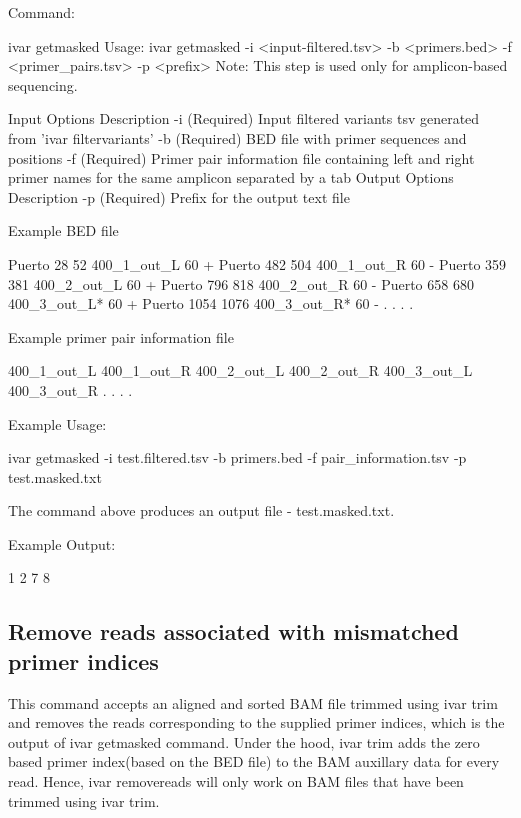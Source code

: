 Command\+:


\begin{DoxyCode}
ivar getmasked
Usage: ivar getmasked -i <input-filtered.tsv> -b <primers.bed> -f <primer\_pairs.tsv> -p <prefix>
Note: This step is used only for amplicon-based sequencing.

Input Options    Description
           -i    (Required) Input filtered variants tsv generated from 'ivar filtervariants'
           -b    (Required) BED file with primer sequences and positions
           -f    (Required) Primer pair information file containing left and right primer names for the
       same amplicon separated by a tab
Output Options   Description
           -p    (Required) Prefix for the output text file
\end{DoxyCode}


Example B\+ED file


\begin{DoxyCode}
Puerto  28  52  400\_1\_out\_L 60  +
Puerto  482 504 400\_1\_out\_R 60  -
Puerto  359 381 400\_2\_out\_L 60  +
Puerto  796 818 400\_2\_out\_R 60  -
Puerto  658 680 400\_3\_out\_L*    60  +
Puerto  1054    1076    400\_3\_out\_R*    60  -
.
.
.
.
\end{DoxyCode}


Example primer pair information file


\begin{DoxyCode}
400\_1\_out\_L    400\_1\_out\_R
400\_2\_out\_L    400\_2\_out\_R
400\_3\_out\_L    400\_3\_out\_R
.
.
.
.
\end{DoxyCode}


Example Usage\+:


\begin{DoxyCode}
ivar getmasked -i test.filtered.tsv -b primers.bed -f pair\_information.tsv -p test.masked.txt
\end{DoxyCode}


The command above produces an output file -\/ test.\+masked.\+txt.

Example Output\+:


\begin{DoxyCode}
1 2 7 8
\end{DoxyCode}
\hypertarget{manualpage_autotoc_md21}{}\subsection{Remove reads associated with mismatched primer indices}\label{manualpage_autotoc_md21}
This command accepts an aligned and sorted B\+AM file trimmed using {\ttfamily ivar trim} and removes the reads corresponding to the supplied primer indices, which is the output of {\ttfamily ivar getmasked} command. Under the hood, {\ttfamily ivar trim} adds the zero based primer index(based on the B\+E\+D file) to the B\+AM auxillary data for every read. Hence, ivar removereads will only work on B\+AM files that have been trimmed using {\ttfamily ivar trim}.

